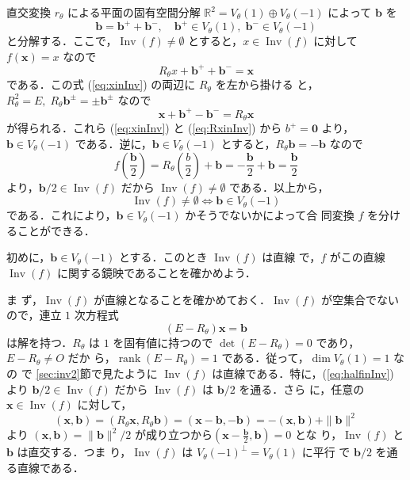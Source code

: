 \documentclass[11pt, uplatex, dvipdfmx, titlepage]{jsarticle}
\DeclareMathOperator{\Inv}{Inv}
\DeclareMathOperator{\rank}{rank}
\theoremstyle{definition}
\begin{document}
直交変換 $r_{\theta}$ による平面の固有空間分解
$\mathbb{R}^2 = V_{\theta}(1) \oplus V_{\theta}(-1)$ によって $\bm{b}$
を
\begin{equation}\label{eq:eigendecomp2}
  \bm{b} = \bm{b}^{+} + \bm{b}^{-}, \quad \bm{b}^{+} \in V_{\theta}(1), \; \bm{b}^{-} \in V_{\theta}(-1)
\end{equation}
と分解する．ここで，$\Inv(f) \neq \emptyset$ とすると，$x \in \Inv(f)$
に対して $f(\bm{x}) = {x}$ なので
\begin{equation}\label{eq:xinInv}
  R_{\theta}x +\bm{b}^{+} + \bm{b}^{-} = \bm{x}
\end{equation}
である．この式 (\ref{eq:xinInv}) の両辺に $R_{\theta}$ を左から掛ける
と，$R_{\theta}^2=E, \; R_{\theta} \bm{b}^{\pm} = \pm \bm{b}^{\pm}$ なので
\begin{equation}\label{eq:RxinInv}
  \bm{x}+\bm{b}^{+}-\bm{b}^{-}=R_{\theta}\bm{x} 
\end{equation}
が得られる．これら (\ref{eq:xinInv}) と (\ref{eq:RxinInv}) から $b^{+}
= \bm{0}$ より，$\bm{b} \in V_{\theta}(-1)$
である．逆に，$\bm{b} \in V_{\theta}(-1)$ とすると，$R_{\theta}\bm{b}
= -\bm{b}$ なので
\begin{equation}\label{eq:halfinInv}
  f\left(\frac{\bm{b}}{2}\right) = R_{\theta}\left(\frac{b}{2}\right) + \bm{b}
  = -\frac{\bm{b}}{2}+\bm{b} = \frac{\bm{b}}{2}
\end{equation}
より，$\bm{b}/2 \in \Inv(f)$ だから $\Inv(f) \neq \emptyset$ である．以上から，
\[
  \Inv(f) \neq \emptyset \Leftrightarrow \bm{b} \in V_{\theta}(-1)
\]
である．これにより，$\bm{b} \in V_{\theta}(-1)$ かそうでないかによって合
同変換 $f$ を分けることができる．


初めに，$\bm{b} \in V_{\theta}(-1)$ とする．このとき $\Inv(f)$ は直線
で，$f$ がこの直線 $\Inv(f)$ に関する鏡映であることを確かめよう．

ま
ず，$\Inv(f)$ が直線となることを確かめておく．$\Inv(f)$ が空集合でない
ので，連立 $1$ 次方程式
\[
  (E-R_{\theta})\bm{x} = \bm{b}
\]
は解を持つ．$R_{\theta}$ は $1$ を固有値に持つので $\det
(E-R_{\theta}) = 0$ であり，$E-R_{\theta} \neq O$ だか
ら，$\rank(E-R_{\theta})=1$ である．従って，$\dim V_{\theta}(1)=1$ なの
で \ref{sec:inv2}節で見たように $\Inv(f)$ は直線である．特に，(\ref{eq:halfinInv})
より $\bm{b}/2 \in \Inv(f)$ だから $\Inv(f)$ は $\bm{b}/2$ を通る．さら
に，任意の $\bm{x} \in \Inv(f)$ に対して，
\[
  (\bm{x}, \bm{b}) = (R_{\theta}\bm{x}, R_{\theta}\bm{b}) =
  (\bm{x}-\bm{b}, -\bm{b}) = -(\bm{x},\bm{b})+\|\bm{b}\|^2
\]
より $(\bm{x}, \bm{b}) = \|\bm{b}\|^2/2$
が成り立つから$\left( \bm{x}-\frac{\bm{b}}{2}, \bm{b}\right) =0$ とな
り，$\Inv(f)$ と $\bm{b}$ は直交する．つま
り，$\Inv(f)$ は $V_{\theta}(-1)^{\perp}=V_{\theta}(1)$ に平行
で $\bm{b}/2$ を通る直線である．
\end{document}
